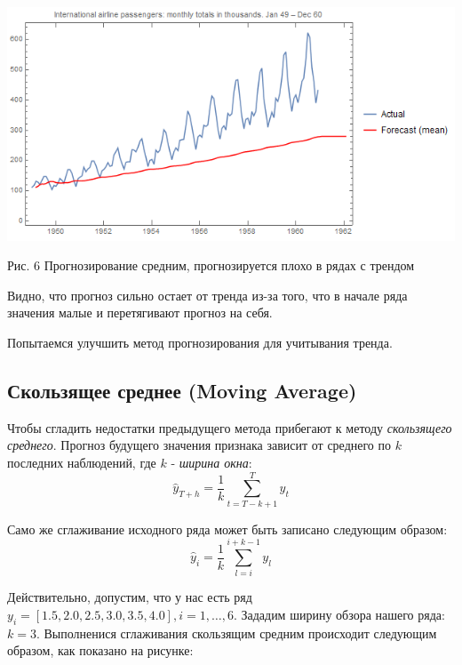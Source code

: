 \documentclass[aps,%
12pt,%
final,%
oneside,
onecolumn,%
musixtex, %
superscriptaddress,%
centertags]{article} %
\theoremstyle{plain}
\theoremstyle{definition}
\theoremstyle{remark}
\begin{document}
\begin{center}
	\includegraphics[scale=0.5]{images/6.png}

	Рис. 6 Прогнозирование средним, прогнозируется плохо в рядах с трендом
\end{center}

Видно, что прогноз сильно остает от тренда из-за того, что в начале ряда значения малые и перетягивают прогноз на себя.

Попытаемся улучшить метод прогнозирования для учитывания тренда.

\newpage
\subsection{Скользящее среднее (Moving Average)}

Чтобы сгладить недостатки предыдущего метода прибегают к методу \textit{скользящего среднего}. Прогноз будущего значения признака зависит от среднего по $k$ последних наблюдений, где $k$ - \textit{ширина окна}:
$$\hat{y}_{T+h} = \frac{1}{k} \sum\limits_{t = T-k+1}^T y_t$$

Само же сглаживание исходного ряда может быть записано следующим образом:
$$\hat{y}_i = \frac{1}{k} \sum\limits_{l=i}^{i+k-1} y_l$$

Действительно, допустим, что у нас есть ряд $y_i = [1.5,2.0,2.5,3.0,3.5,4.0], i = 1,\ldots,6$. Зададим ширину обзора нашего ряда: $k=3$. Выполненися сглаживания скользящим средним происходит следующим образом, как показано на рисунке:
\end{document}
